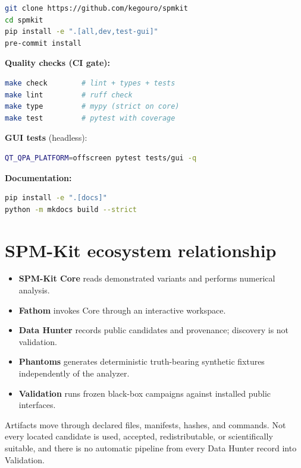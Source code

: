 \documentclass[a4paper,11pt]{article}
\begin{document}
\begin{lstlisting}[language=bash]
git clone https://github.com/kegouro/spmkit
cd spmkit
pip install -e ".[all,dev,test-gui]"
pre-commit install
\end{lstlisting}

\textbf{Quality checks (CI gate):}
\begin{lstlisting}[language=bash]
make check        # lint + types + tests
make lint         # ruff check
make type         # mypy (strict on core)
make test         # pytest with coverage
\end{lstlisting}

\textbf{GUI tests} (headless):
\begin{lstlisting}[language=bash]
QT_QPA_PLATFORM=offscreen pytest tests/gui -q
\end{lstlisting}

\textbf{Documentation:}
\begin{lstlisting}[language=bash]
pip install -e ".[docs]"
python -m mkdocs build --strict
\end{lstlisting}

\section{SPM-Kit ecosystem relationship}

\begin{itemize}
  \item \textbf{SPM-Kit Core} reads demonstrated variants and performs numerical analysis.
  \item \textbf{Fathom} invokes Core through an interactive workspace.
  \item \textbf{Data Hunter} records public candidates and provenance; discovery is not validation.
  \item \textbf{Phantoms} generates deterministic truth-bearing synthetic fixtures independently of the analyzer.
  \item \textbf{Validation} runs frozen black-box campaigns against installed public interfaces.
\end{itemize}

Artifacts move through declared files, manifests, hashes, and commands. Not every located
candidate is used, accepted, redistributable, or scientifically suitable, and there is no
automatic pipeline from every Data Hunter record into Validation.
\end{document}
